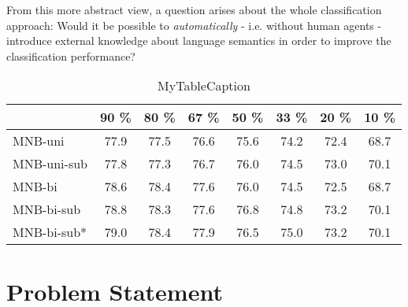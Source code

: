 From this more abstract view, a question arises about the whole classification approach: Would it be possible to \textit{automatically} - i.e. without human agents - introduce external knowledge about language semantics in order to improve the classification performance?
\begin{table}                                                  
\centering                                                     
\begin{tabular}{|l|c|c|c|c|c|c|c|}                             
\hline                                                         
 & 90 \% & 80 \% & 67 \% & 50 \% & 33 \% & 20 \% & 10 \% \\    
\hline                                                         
MNB-uni & 77.9 & 77.5 & 76.6 & 75.6 & 74.2 & 72.4 & 68.7 \\    
\hline                                                         
MNB-uni-sub & 77.8 & 77.3 & 76.7 & 76.0 & 74.5 & 73.0 & 70.1 \\
\hline                                                         
\hline
MNB-bi & 78.6 & 78.4 & 77.6 & 76.0 & 74.5 & 72.5 & 68.7 \\     
\hline                                                         
MNB-bi-sub & 78.8 & 78.3 & 77.6 & 76.8 & 74.8 & 73.2 & 70.1 \\ 
\hline                                                         
MNB-bi-sub* & 79.0 & 78.4 & 77.9 & 76.5 & 75.0 & 73.2 & 70.1 \\
\hline                                                         
\end{tabular}                                                  
\caption{MyTableCaption}                                       
\label{table:MyTableLabel}                                     
\end{table}     

\section{Problem Statement}
\label{sec:problem-statement}